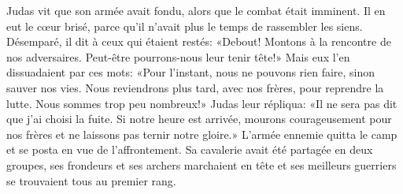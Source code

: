 Judas vit que son armée avait fondu, alors que le combat était imminent.
Il en eut le cœur brisé, parce qu’il n’avait plus le temps de rassembler les siens.
Désemparé, il dit à ceux qui étaient restés:
	«Debout! Montons à la rencontre de nos adversaires.
	Peut-être pourrons-nous leur tenir tête!»
Mais eux l’en dissuadaient par ces mots:
	«Pour l’instant, nous ne pouvons rien faire, sinon sauver nos vies.
	Nous reviendrons plus tard, avec nos frères, pour reprendre la lutte.
	Nous sommes trop peu nombreux!»
Judas leur répliqua: «Il ne sera pas dit que j’ai choisi la fuite.
	Si notre heure est arrivée, mourons courageusement pour nos frères
	et ne laissons pas ternir notre gloire.»
L’armée ennemie quitta le camp et se posta en vue de l’affrontement.
Sa cavalerie avait été partagée en deux groupes,
	ses frondeurs et ses archers marchaient en tête
	et ses meilleurs guerriers se trouvaient tous au premier rang.
